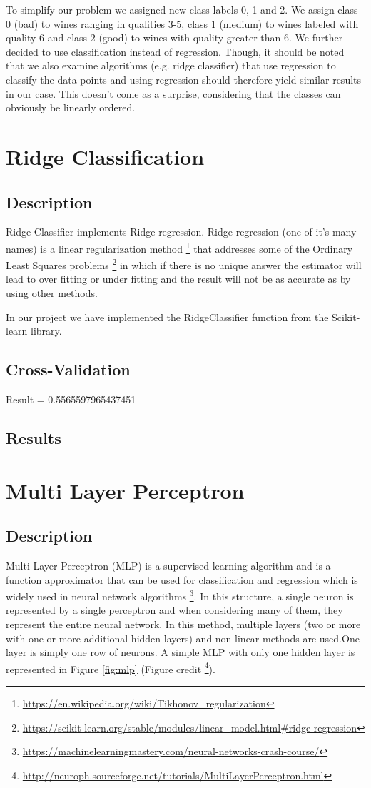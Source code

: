 \documentclass[twocolumn]{scrartcl}
\begin{document}
To simplify our problem we assigned new class labels 0, 1 and 2. We assign class 0 (bad) to wines ranging in qualities 3-5,
class 1 (medium) to wines labeled with quality 6 and class 2 (good) to wines with quality greater than 6.
We further decided to use classification instead of regression.
Though, it should be noted that we also examine algorithms (e.g. ridge classifier) that use regression to classify the data points
and using regression should therefore yield similar results in our case.
This doesn't come as a surprise, considering that the classes can obviously be linearly ordered.

\section{Ridge Classification}
\subsection{Description}
Ridge Classifier implements Ridge regression.
Ridge regression (one of it's many names) is a linear regularization method
\footnote{\url{https://en.wikipedia.org/wiki/Tikhonov_regularization}} 
that addresses some of the Ordinary Least Squares problems
\footnote{\url{https://scikit-learn.org/stable/modules/linear_model.html\#ridge-regression}}
in which if there is no unique answer the estimator will lead to over fitting or under fitting and the result will not be as accurate as by using other methods.

In our project we have implemented the RidgeClassifier function from the Scikit-learn library.
\subsection{Cross-Validation}
Result = 0.5565597965437451
\subsection{Results}

\section{Multi Layer Perceptron}
\subsection{Description}
Multi Layer Perceptron (MLP) is a supervised learning algorithm and is a function approximator that can be used for classification and regression which is widely used in neural network algorithms \footnote{\url{https://machinelearningmastery.com/neural-networks-crash-course/}}.
In this structure, a single neuron is represented by a single perceptron and when considering many of them, they represent the entire neural network. In this method, multiple layers (two or more with one or more additional hidden layers) and non-linear methods are used.One layer is simply one row of neurons. A simple MLP with only one hidden layer is represented in Figure \ref{fig:mlp} (Figure credit \footnote{\url{http://neuroph.sourceforge.net/tutorials/MultiLayerPerceptron.html}}).
\end{document}
